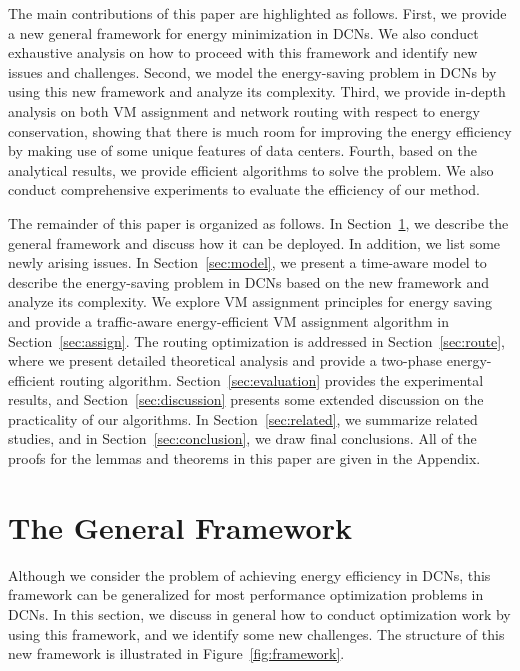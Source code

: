\documentclass[journal,single-space,two column,twoside,10pt]{IEEEtran}
\begin{document}
The main contributions of this paper are highlighted as follows. First, we provide a new general framework for energy minimization in DCNs. We also conduct exhaustive analysis on how to proceed with this framework and identify new issues and challenges. Second, we model the energy-saving problem in DCNs by using this new framework and analyze its complexity. Third, we provide in-depth analysis on both VM assignment and network routing with respect to energy conservation, showing that there is much room for improving the energy efficiency by making use of some unique features of data centers. Fourth, based on the analytical results, we provide efficient algorithms to solve the problem. We also conduct comprehensive experiments to evaluate the efficiency of our method. 

The remainder of this paper is organized as follows. In Section~\ref{sec:framework}, we describe the general framework and discuss how it can be deployed. In addition, we list some newly arising issues. In Section~\ref{sec:model}, we present a time-aware model to describe the energy-saving problem in DCNs based on the new framework and analyze its complexity. We explore VM assignment principles for energy saving and provide a traffic-aware energy-efficient VM assignment algorithm in Section~\ref{sec:assign}. The routing optimization is addressed in Section~\ref{sec:route}, where we present detailed theoretical analysis and provide a two-phase energy-efficient routing algorithm. Section~\ref{sec:evaluation} provides the experimental results, and Section~\ref{sec:discussion} presents some extended discussion on the practicality of our algorithms. In Section~\ref{sec:related}, we summarize related studies, and in Section~\ref{sec:conclusion}, we draw final conclusions. All of the proofs for the lemmas and theorems in this paper are given in the Appendix.


\section{The General Framework}
\label{sec:framework}

Although we consider the problem of achieving energy efficiency in DCNs, this framework can be generalized for most performance optimization problems in DCNs. In this section, we discuss in general how to conduct optimization work by using this framework, and we identify some new challenges. The structure of this new framework is illustrated in Figure~\ref{fig:framework}.
\end{document}
